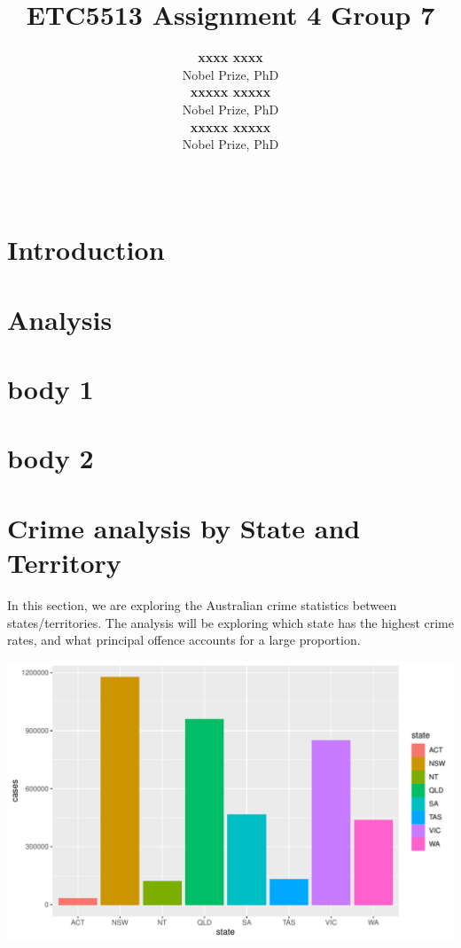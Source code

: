 \documentclass[11pt,a4paper,]{article}
\title{ETC5513 Assignment 4 Group 7}
\author{\sf\Large\textbf{ xxxx xxxx}\\ {\sf\large Nobel Prize, PhD\\[0.5cm]} \sf\Large\textbf{ xxxxx xxxxx}\\ {\sf\large Nobel Prize, PhD\\[0.5cm]} \sf\Large\textbf{ xxxxx xxxxx}\\ {\sf\large Nobel Prize, PhD\\[0.5cm]}}
\date{\sf\Date~\Month~\Year}
\makeatletter
\def\titlepage{\front{\expandafter{\@title}}{\@author}{\@organization}}
\let\origfigure\figure
\let\endorigfigure\endfigure
\renewenvironment{figure}[1][2] {
\expandafter\origfigure\expandafter[H]
} {
\endorigfigure
}
\makeatother
\begin{document}
\titlepage

\hypertarget{introduction}{%
\section{Introduction}\label{introduction}}

\hypertarget{analysis}{%
\section{Analysis}\label{analysis}}

\section*{body 1}

\section*{body 2}

\section*{Crime analysis by State and Territory}

In this section, we are exploring the Australian crime statistics between states/territories. The analysis will be exploring which state has the highest crime rates, and what principal offence accounts for a large proportion.

\begin{figure}
\centering
\includegraphics{ETC5513-Assignment4_files/figure-latex/graph1-1.pdf}
\caption{\label{fig:graph1}state-crime}
\end{figure}
\end{document}
